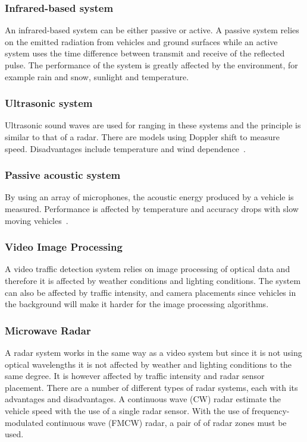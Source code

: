 \subsubsection{Infrared-based system}
An infrared-based system can be either passive or active. A passive system relies on the emitted radiation from vehicles and ground surfaces while an active system uses the time difference between transmit and receive of the reflected pulse. The performance of the system is greatly affected by the environment, for example rain and snow, sunlight and temperature.

\subsubsection{Ultrasonic system}
Ultrasonic sound waves are used for ranging in these systems and the principle is similar to that of a radar. There are models using Doppler shift to measure speed. Disadvantages include temperature and wind dependence~\cite{path2007}.

\subsubsection{Passive acoustic system}
By using an array of microphones, the acoustic energy produced by a vehicle is measured. Performance is affected by temperature and accuracy drops with slow moving vehicles~\cite{path2007}.

\subsubsection{Video Image Processing}

A video traffic detection system relies on image processing of optical data and therefore it is affected by weather conditions and lighting conditions. The system can also be affected by traffic intensity, and camera placements since vehicles in the background will make it harder for the image processing algorithms. 

\subsubsection{Microwave Radar}

A radar system works in the same way as a video system but since it is not using optical wavelengths it is not affected by weather and lighting conditions to the same degree. It is however affected by traffic intensity and radar sensor placement.
There are a number of different types of radar systems, each with its advantages and disadvantages. A continuous wave (CW) radar estimate the vehicle speed with the use of a single radar sensor. With the use of frequency-modulated continuous wave (FMCW) radar, a pair of of radar zones must be used.


